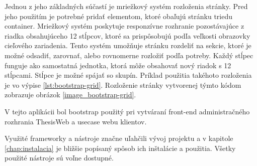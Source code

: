 	Jednou z jeho základných súčastí je mriežkový systém rozloženia stránky. Pred jeho použitím je potrebné pridať elementom, ktoré obaľujú stránku triedu container.	Mriežkový systém poskytuje responzívne rozhranie pozostávajúce z riadka obsahujúceho 12 stĺpcov, ktoré sa prispôsobujú podľa veľkosti obrazovky cieľového zariadenia. Tento systém umožňuje stránku rozdeliť na sekcie, ktoré je možné odsadiť, zarovnať, alebo rovnomerne rozložiť podľa potreby. Každý stĺpec funguje ako samostatná jednotka, ktorá môže obsahovať nový riadok s 12 stĺpcami. Stĺpce je možné spájať so skupín. Príklad použitia takéhoto rozloženia je vo výpise \ref{lst:bootstrap-grid}. Rozloženie stránky vytvorenej týmto kódom zobrazuje obrázok \ref{image_bootstrap-grid}.
					
	V tejto aplikácii bol bootstrap použitý pri vytváraní front-end administračného rozhrania ThesisWeb a usecase webu klientov.
	
	Využité frameworky a nástroje značne uľahčili vývoj projektu a v kapitole \ref{chap:instalacia} je bližšie popísaný spôsob ich inštalácie a použitia. Všetky použité nástroje sú voľne dostupné.
	